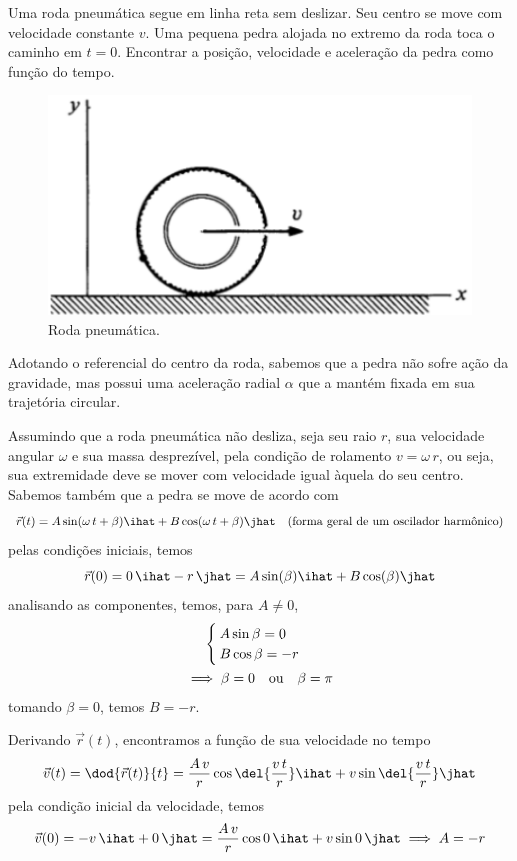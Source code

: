 \documentclass[]{IMTexam}
\begin{document}
\begin{questions}
	\question Uma roda pneumática segue em linha reta sem deslizar. Seu centro se move com velocidade constante $ v $. Uma pequena pedra alojada no extremo da roda toca o caminho em $ t = 0 $. Encontrar a posição, velocidade e aceleração da pedra como função do tempo.

	\begin{figure}[H]
		\centering
		\includegraphics[width=0.5\linewidth]{screenshot004}
		\caption{Roda pneumática.}
		\label{fig:fig3}
	\end{figure}

	\begin{solution}
		Adotando o referencial do centro da roda, sabemos que a pedra não sofre ação da gravidade, mas possui uma aceleração radial $ \alpha $ que a mantém fixada em sua trajetória circular.

		Assumindo que a roda pneumática não desliza, seja seu raio $ r $, sua velocidade angular $ \omega $ e sua massa desprezível, pela condição de rolamento $ v=\omega\,r $, ou seja, sua extremidade deve se mover com velocidade igual àquela do seu centro. Sabemos também que a pedra se move de acordo com
		\begin{equation}\label{eq:rsiwr}
			\vec{r}(t)=A\sin(\omega\,t+\beta)\ihat+B\cos(\omega\,t+\beta)\jhat\quad\textup{(forma geral de um oscilador harmônico)}
		\end{equation}
		pelas condições iniciais, temos
		\[ \vec{r}(0)=0\,\ihat-r\,\jhat=A\sin(\beta)\ihat+B\cos(\beta)\jhat \]
		analisando as componentes, temos, para $ A\neq0 $,
		\begin{gather*}
			\begin{cases}
				A\sin\beta=0 \\
				B\cos\beta=-r
			\end{cases}\\
			\implies \beta=0\quad\textup{ou}\quad\beta=\pi
		\end{gather*}
		tomando $ \beta=0 $, temos $ B=-r $.

		Derivando $ \vec{r}(t) $, encontramos a função de sua velocidade no tempo
		\[ \vec{v}(t)=\dod{\vec{r}(t)}{t}=\dfrac{A\,v}{r}\cos\del{\dfrac{v\,t}{r}}\ihat+v\sin\del{\dfrac{v\,t}{r}}\jhat \]
		pela condição inicial da velocidade, temos
		\[ \vec{v}(0)=-v\,\ihat+0\,\jhat=\dfrac{A\,v}{r}\cos0\,\ihat+v\sin0\,\jhat\implies A=-r \]


\end{solution}
\end{questions}
\end{document}
